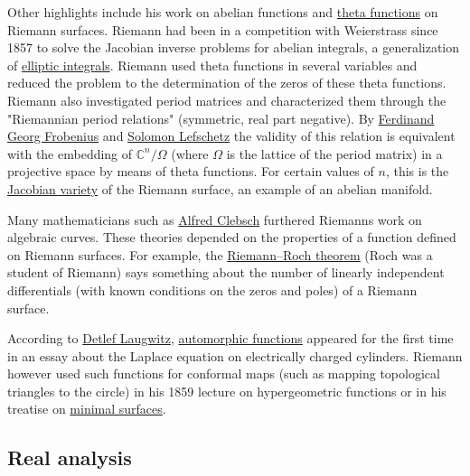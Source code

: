 Other highlights include his work on abelian functions and \href{https://en.wikipedia.org/wiki/Theta_functions}{theta functions} on Riemann surfaces. Riemann had been in a competition with Weierstrass since 1857 to solve the Jacobian inverse problems for abelian integrals, a generalization of \href{https://en.wikipedia.org/wiki/Elliptic_integrals}{elliptic integrals}. Riemann used theta functions in several variables and reduced the problem to the determination of the zeros of these theta functions. Riemann also investigated period matrices and characterized them through the "Riemannian period relations" (symmetric, real part negative). By \href{https://en.wikipedia.org/wiki/Ferdinand_Georg_Frobenius}{Ferdinand Georg Frobenius} and \href{https://en.wikipedia.org/wiki/Solomon_Lefschetz}{Solomon Lefschetz} the validity of this relation is equivalent with the embedding of {{\(\mathbb{C}^{n}/\Omega\)}{}} (where {{\(\Omega\)}{}} is the lattice of the period matrix) in a projective space by means of theta functions. For certain values of {{\(n\)}{}}, this is the \href{https://en.wikipedia.org/wiki/Jacobian_variety}{Jacobian variety} of the Riemann surface, an example of an abelian manifold.

Many mathematicians such as \href{https://en.wikipedia.org/wiki/Alfred_Clebsch}{Alfred Clebsch} furthered Riemann\textquotesingle s work on algebraic curves. These theories depended on the properties of a function defined on Riemann surfaces. For example, the \href{https://en.wikipedia.org/wiki/Riemann–Roch_theorem}{Riemann--Roch theorem} (Roch was a student of Riemann) says something about the number of linearly independent differentials (with known conditions on the zeros and poles) of a Riemann surface.

According to \href{https://en.wikipedia.org/wiki/Detlef_Laugwitz}{Detlef Laugwitz}, \href{https://en.wikipedia.org/wiki/Automorphic_function}{automorphic functions} appeared for the first time in an essay about the Laplace equation on electrically charged cylinders. Riemann however used such functions for conformal maps (such as mapping topological triangles to the circle) in his 1859 lecture on hypergeometric functions or in his treatise on \href{https://en.wikipedia.org/wiki/Minimal_surface}{minimal surfaces}.


\subsection{Real analysis}\label{Real_analysis}

